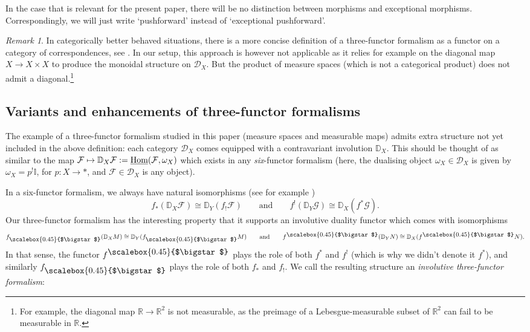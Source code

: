 \documentclass[10pt,a4paper,oneside]{amsart}
\theoremstyle{remark}
\newtheorem{remark}[theorem]{Remark}
\theoremstyle{definition}
\newcommand{\Hom}{\textnormal{Hom}}
\newcommand{\rar}{\rightarrow}
\newcommand{\smsq}{{\mathbin{\vcenter{\hbox{\scalebox{0.45}{$\bigstar$}}}}}}
\newcommand{\pull}[1]{#1^\smsq}
\newcommand{\push}[1]{#1_\smsq}
\begin{document}
In the case that is relevant for the present paper, there will be no distinction between morphisms and exceptional morphisms.
Correspondingly, we will just write `pushforward' instead of `exceptional pushforward'.

\begin{remark}\label{rem 2.5}
	In categorically better behaved situations, there is a more concise definition of a three-functor formalism as a functor on a category of correspondences, see \cite{Scholze2022}. In our setup, this approach is however not applicable as it relies for example on the diagonal map $X\rar X\times X$ to produce the monoidal structure on $\mathcal D_X$. But the product of measure spaces (which is not a categorical product) does not admit a diagonal.\footnote{For example, the diagonal map $\mathbb R\to \mathbb R^2$ is not measurable, as the preimage of a Lebesgue-measurable subset of $\mathbb R^2$ can fail to be measurable in $\mathbb R$.}
\end{remark}

\subsection{Variants and enhancements of three-functor formalisms}
\label{sec:Variants and enhancements of three-functor formalisms}
The example of a three-functor formalism studied in this paper (measure spaces and measurable maps) admits extra structure not yet included in the above definition: each category $\mathcal D_X$ comes equipped with a contravariant involution $\mathbb D_X$. This should be thought of as similar to 
the map $\mathcal F \mapsto \mathbb D_X\mathcal F:=\underline{\Hom}(\mathcal F,\omega_X)$ which exists in any \emph{six}-functor formalism (here, the dualising object $\omega_X\in\mathcal D_X$ is given by $\omega_X=p^!\mathbb I$, for $p:X\to *$, and $\mathcal F\in\mathcal D_X$ is any object). 

In a six-functor formalism, we always have natural isomorphisms (see for example \cite[Section A.5]{Cisinski2019})
\[
f_*(\mathbb D_X\mathcal F) \cong 
\mathbb D_Y(f_!\mathcal F)
\qquad
\text{and}
\qquad
f^!(\mathbb D_Y\mathcal G) \cong 
\mathbb D_X(f^*\mathcal G).
\]
Our three-functor formalism has the interesting property that it supports an involutive duality functor which comes with isomorphisms
\[
\push{f}(\mathbb D_X M) \cong 
\mathbb D_Y(\push{f} M)
\qquad
\text{and}
\qquad
\pull{f}(\mathbb D_YN) \cong 
\mathbb D_X(\pull{f}N).
\]
In that sense, the functor $\pull{f}$ plays the role of both $f^*$ and $f^!$ (which is why we didn't denote it $f^*$), and similarly $\push{f}$ plays the role of both $f_*$ and $f_!$.
We call the resulting structure an \emph{involutive three-functor formalism}:
\end{document}
